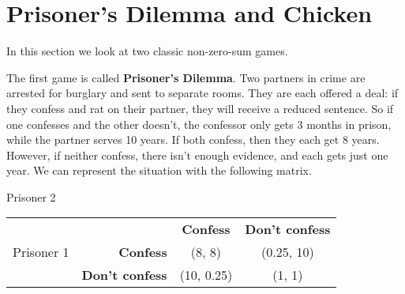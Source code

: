 
\section{Prisoner's Dilemma and Chicken}



\vspace{.1in}
In this section we look at two classic non-zero-sum games. 

The first game is called {\bf Prisoner's Dilemma}. Two partners in crime are arrested for  burglary and sent to separate rooms. They are each offered a deal: if they confess and rat on their partner, they will receive a reduced sentence. So if one confesses and the other doesn't, the confessor only gets 3 months in prison, while the partner serves 10 years. If both confess, then they each get 8 years. However, if neither confess, there isn't enough evidence, and each gets just one year. We can represent the situation with the following matrix.

\hspace{3in}Prisoner 2

\begin{center}
\begin{tabular}{l|r|c|c|}\cline{2-4}
&&\textbf{Confess}&\textbf{Don't confess}\\ \cline{2-4}
Prisoner 1&\textbf{Confess} &(8, 8)&(0.25, 10)\\ \cline{2-4}
&\textbf{Don't confess} &(10, 0.25)&(1, 1)\\ \cline{2-4}
\end{tabular}
\end{center}
\vspace{.1in}

